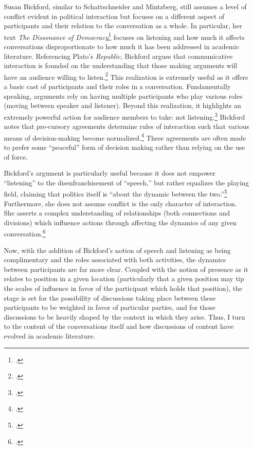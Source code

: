 \documentclass[openany,twoside]{memoir}
\begin{document}
\begin{Spacing}{2}
Susan Bickford, similar to Schattschneider and Mintzberg, still assumes a level of conflict evident in political interaction but focuses on a different aspect of participants and their relation to the conversation as a whole.
In particular, her text \emph{The Dissonance of Democracy}\footcite{bickford96} focuses on listening and how much it affects conversations disproportionate to how much it has been addressed in academic literature. 
Referencing Plato's \emph{Republic}, Bickford argues that communicative interaction is founded on the understanding that those making arguments will have an audience willing to listen.\footcite[3]{bickford96}
This realization is extremely useful as it offers a basic cast of participants and their roles in a conversation.
Fundamentally speaking, arguments rely on having multiple participants who play various roles (moving between speaker and listener).
Beyond this realization, it highlights an extremely powerful action for audience members to take: not listening.\footcite[3]{bickford96}
Bickford notes that pre-cursory agreements determine rules of interaction such that various means of decision-making become normalized.\footcite[3--5. Simply put, these pre-cursory agreements can be understood as ``constitutions''---both formal and informal institutions which govern interaction.]{bickford96}
These agreements are often made to prefer some ``peaceful'' form of decision making rather than relying on the use of force.

Bickford's argument is particularly useful because it does not empower ``listening'' to the disenfranchisement of ``speech,'' but rather equalizes the playing field, claiming that politics itself is ``about the dynamic between the two.''\footcite[4]{bickford96}
Furthermore, she does not assume conflict is the only character of interaction.
She asserts a complex understanding of relationships (both connections and divisions) which influence actions through affecting the dynamics of any given conversation.\footcite[9--11]{bickford96}

Now, with the addition of Bickford's notion of speech and listening as being complimentary and the roles associated with both activities, the dynamics between participants are far more clear.
Coupled with the notion of presence as it relates to position in a given location (particularly that a given position may tip the scales of influence in favor of the participant which holds that position), the stage is set for the possibility of discussions taking place between these participants to be weighted in favor of particular parties, and for those discussions to be heavily shaped by the context in which they arise.
Thus, I turn to the content of the conversations itself and how discussions of content have evolved in academic literature.


\end{Spacing}
\end{document}
